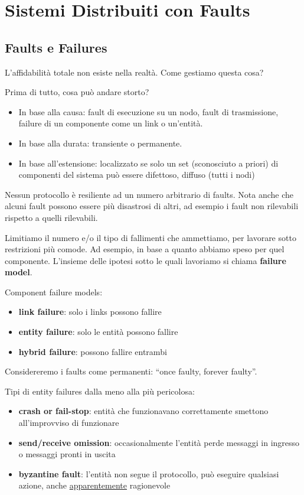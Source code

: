 \section{Sistemi Distribuiti con Faults}
\subsection{Faults e Failures}
L'affidabilità totale non esiste nella realtà. Come gestiamo questa cosa?

Prima di tutto, cosa può andare storto?
\begin{itemize}
  \item In base alla causa: fault di esecuzione su un nodo, fault di trasmissione, failure di un componente come un link o un'entità.
  \item In base alla durata: transiente o permanente.
  \item In base all'estensione: localizzato se solo un set (sconosciuto a priori) di componenti del sistema può essere difettoso, 
  diffuso (tutti i nodi)
\end{itemize}

Nessun protocollo è resiliente ad un numero arbitrario di faults.
Nota anche che alcuni fault possono essere più disastrosi di altri, ad esempio i fault non rilevabili rispetto a quelli rilevabili.

Limitiamo il numero e/o il tipo di fallimenti che ammettiamo, per lavorare sotto restrizioni più comode.
Ad esempio, in base a quanto abbiamo speso per quel componente.
L'insieme delle ipotesi sotto le quali lavoriamo si chiama \textbf{failure model}.

Component failure models:
\begin{itemize}
  \item \textbf{link failure}: solo i links possono fallire
  \item \textbf{entity failure}: solo le entità possono fallire
  \item \textbf{hybrid failure}: possono fallire entrambi
\end{itemize}

Considereremo i faults come permanenti: ``once faulty, forever faulty''.

Tipi di entity failures dalla meno alla più pericolosa:
\begin{itemize}
  \item \textbf{crash or fail-stop}: entità che funzionavano correttamente smettono all'improvviso di funzionare
  \item \textbf{send/receive omission}: occasionalmente l'entità perde messaggi in ingresso o messaggi pronti in uscita
  \item \textbf{byzantine fault}: l'entità non segue il protocollo, può eseguire qualsiasi azione, anche \underline{apparentemente} ragionevole
\end{itemize}


